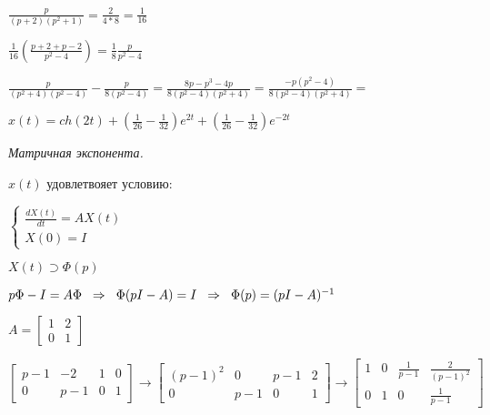 \documentclass{article}
\begin{document}
\begin{large}
\begin{Large}
\vspace{0.5cm}
$
\frac{p}{(p+2)(p^2+1)} = \frac{2}{4*8} = \frac{1}{16}
$

\vspace{0.5cm}
$
\frac{1}{16}(\frac{p+2 +p-2}{p^2 -4}) = \frac{1}{8}\frac{p}{p^2 - 4}
$

\vspace{0.5cm}
$
\frac{p}{(p^2 + 4)(p^2 - 4)} - \frac{p}{8(p^2 - 4)} 
=
\frac{8p-p^3-4p}{8(p^2-4)(p^2 +4)}
=
\frac{-p(p^2 -4)}{8(p^2-4)(p^2 +4)}
=
$


\vspace{0.5cm}
$
x(t) = ch(2t) + (\frac{1}{26} - \frac{1}{32})e^{2t}
+
(\frac{1}{26} - \frac{1}{32})e^{-2t}
$
\end{Large}

\newpage
\begin{Large}
\textit{Матричная экспонента.}
\end{Large}

\vspace{0.5cm}
$
x(t) 
$
\hspace{0.2cm} удовлетвояет условию: 

\vspace{0.5cm}
$
\begin{cases}
\frac{dX(t)}{dt} = AX(t)
\\
X(0) = I
\end{cases}
$

\vspace{0.5cm}
$
X(t)\supset\Phi(p)
$

\vspace{0.5cm}
$
p\Phi - I  = A\Phi
\text{\hspace{0.2cm}}
\Rightarrow
\text{\hspace{0.2cm}}
\Phi(pI - A) = I
\text{\hspace{0.2cm}}
\Rightarrow
\text{\hspace{0.2cm}}
\Phi(p) = (pI-A)^{-1}
$

\vspace{0.5cm}
$
A = 
\begin{bmatrix}
1 &  2 \\
0 & 1
\end{bmatrix}
$

\vspace{0.5cm}
 $
\left[\begin{array}{cc|cc} 
p-1 & -2 & 1 & 0 \\
0 & p-1 & 0 & 1
\end{array}\right]
\rightarrow
\left[\begin{array}{cc|cc} 
(p-1)^2 & 0 & p-1 & 2 \\
0 & p-1 & 0 & 1
\end{array}\right]
\rightarrow
\left[\begin{array}{cc|cc} 
1 & 0 & \frac{1}{p-1} & \frac{2}{(p-1)^2} \\
0 & 1 & 0 & \frac{1}{p-1}
\end{array}\right]
$ 



\end{large}
\end{document}
